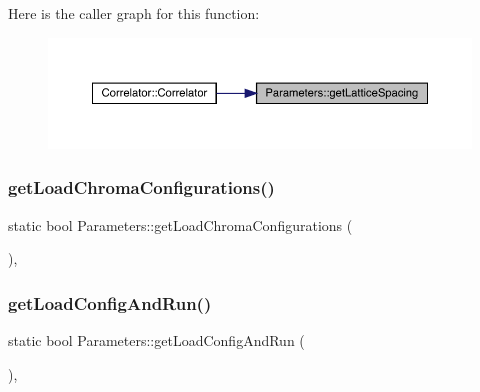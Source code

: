 Here is the caller graph for this function\+:
\nopagebreak
\begin{figure}[H]
\begin{center}
\leavevmode
\includegraphics[width=350pt]{class_parameters_aabe7e3a2468cf11bb5e98e626cb94ff2_icgraph}
\end{center}
\end{figure}
\mbox{\label{class_parameters_a35eef818713a6f5ae20d67e7d64bec2f}} 
\subsubsection{\texorpdfstring{getLoadChromaConfigurations()}{getLoadChromaConfigurations()}}
{\footnotesize\ttfamily static bool Parameters\+::get\+Load\+Chroma\+Configurations (\begin{DoxyParamCaption}{ }\end{DoxyParamCaption})\hspace{0.3cm}{\ttfamily [inline]}, {\ttfamily [static]}}

\mbox{\label{class_parameters_a7870fae41b172caee9fa020c86d056ac}} 
\subsubsection{\texorpdfstring{getLoadConfigAndRun()}{getLoadConfigAndRun()}}
{\footnotesize\ttfamily static bool Parameters\+::get\+Load\+Config\+And\+Run (\begin{DoxyParamCaption}{ }\end{DoxyParamCaption})\hspace{0.3cm}{\ttfamily [inline]}, {\ttfamily [static]}}

